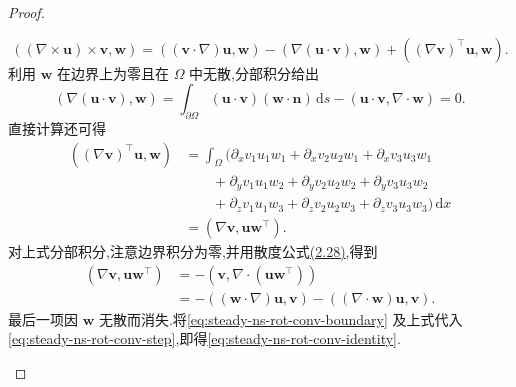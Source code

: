 \begin{proof}
\begin{itemize}
\begin{equation}
    ((\nabla\times\bm{u})\times\bm{v},\bm{w})
      =((\bm{v}\cdot\nabla)\bm{u},\bm{w})
       -(\nabla(\bm{u}\cdot\bm{v}),\bm{w})
       +((\nabla\bm{v})^{\top}\bm{u},\bm{w}).
  \end{equation}
  利用 $\bm{w}$ 在边界上为零且在 $\Omega$ 中无散,分部积分给出
  \begin{equation}\label{eq:steady-ns-rot-conv-boundary}
    (\nabla(\bm{u}\cdot\bm{v}),\bm{w})
      =\int_{\partial\Omega}(\bm{u}\cdot\bm{v})
         (\bm{w}\cdot\bm{n})\,\mathrm{d}s
       -(\bm{u}\cdot\bm{v},\nabla\cdot\bm{w})=0.
  \end{equation}
  直接计算还可得
  \begin{equation}\label{eq:steady-ns-rot-conv-inner-product}
  \begin{aligned}
    ((\nabla\bm{v})^{\top}\bm{u},\bm{w})
      &=\int_\Omega\bigl(
        \partial_xv_1u_1w_1+\partial_xv_2u_2w_1+\partial_xv_3u_3w_1\\
      &\qquad+\partial_yv_1u_1w_2+\partial_yv_2u_2w_2+\partial_yv_3u_3w_2\\
      &\qquad+\partial_zv_1u_1w_3+\partial_zv_2u_2w_3+\partial_zv_3u_3w_3\bigr)\,\mathrm{d}x\\
    &=(\nabla\bm{v},\bm{u}\bm{w}^{\top}).
  \end{aligned}
  \end{equation}
  对上式分部积分,注意边界积分为零,并用散度公式\hyperref[eq:momentum-product-rule]{(2.28)},得到
  \begin{equation}\label{eq:steady-ns-rot-conv-integration-by-parts}
  \begin{aligned}
    (\nabla\bm{v},\bm{u}\bm{w}^{\top})
      &=-(\bm{v},\nabla\cdot(\bm{u}\bm{w}^{\top}))\\
      &=-((\bm{w}\cdot\nabla)\bm{u},\bm{v})
        -((\nabla\cdot\bm{w})\bm{u},\bm{v}).
  \end{aligned}
  \end{equation}
  最后一项因 $\bm{w}$ 无散而消失.将\cref{eq:steady-ns-rot-conv-boundary} 及上式代入\cref{eq:steady-ns-rot-conv-step},即得\cref{eq:steady-ns-rot-conv-identity}.
\end{itemize}
\end{proof}



